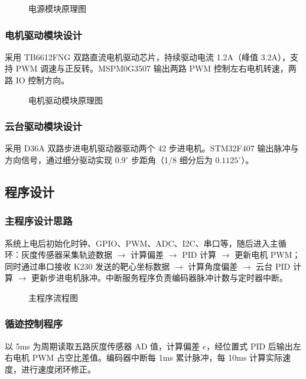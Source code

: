 \documentclass[zihao=-4,fontset=none]{ctexart}
\begin{document}
\begin{figure}[H]
    \centering
    \caption{电源模块原理图}
    \label{fig:e_power}
\end{figure}

\subsubsection{电机驱动模块设计}
采用 TB6612FNG 双路直流电机驱动芯片，持续驱动电流 1.2A（峰值 3.2A），支持 PWM 调速与正反转。MSPM0G3507 输出两路 PWM 控制左右电机转速，两路 IO 控制方向。

\begin{figure}[H]
    \centering
    \caption{电机驱动模块原理图}
    \label{fig:e_motor}
\end{figure}

\subsubsection{云台驱动模块设计}
采用 D36A 双路步进电机驱动器驱动两个 42 步进电机。STM32F407 输出脉冲与方向信号，通过细分驱动实现 $0.9^\circ$ 步距角（1/8 细分后为 $0.1125^\circ$）。

\subsection{程序设计}

\subsubsection{主程序设计思路}
系统上电后初始化时钟、GPIO、PWM、ADC、I2C、串口等，随后进入主循环：灰度传感器采集轨迹数据 $\to$ 计算偏差 $\to$ PID 计算 $\to$ 更新电机 PWM；同时通过串口接收 K230 发送的靶心坐标数据 $\to$ 计算角度偏差 $\to$ 云台 PID 计算 $\to$ 更新步进电机脉冲。中断服务程序负责编码器脉冲计数与定时器中断。

\begin{figure}[H]
    \centering
    \caption{主程序流程图}
    \label{fig:e_flow}
\end{figure}

\subsubsection{循迹控制程序}
以 5ms 为周期读取五路灰度传感器 AD 值，计算偏差 $e$，经位置式 PID 后输出左右电机 PWM 占空比差值。编码器中断每 1ms 累计脉冲，每 10ms 计算实际速度，进行速度闭环修正。
\end{document}
